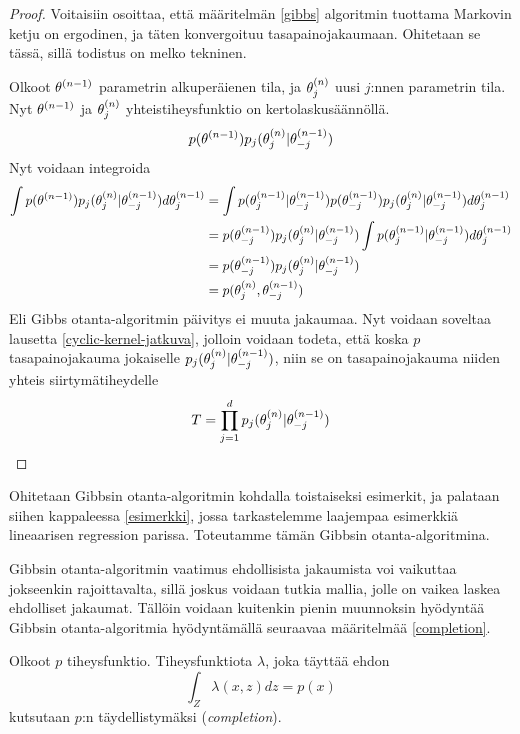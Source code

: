 \begin{proof}
	Voitaisiin osoittaa, että määritelmän \ref{gibbs} algoritmin tuottama Markovin ketju on ergodinen, ja täten konvergoituu tasapainojakaumaan. Ohitetaan se tässä, sillä todistus on melko tekninen.
	
	Olkoot $\theta^{(n-1)}$ parametrin alkuperäienen tila, ja $\theta^{(n)}_j$ uusi $j$:nnen parametrin tila. Nyt $\theta^{(n-1)}$ ja $\theta^{(n)}_j$ yhteistiheysfunktio on kertolaskusäännöllä.
	\begin{equation}
		p(\theta^{(n-1)})p_j(\theta^{(n)}_j|\theta^{(n-1)}_{-j})
	\end{equation}
	Nyt voidaan integroida
	\begin{equation}
		\begin{split}
			\int p(\theta^{(n-1)})p_j(\theta^{(n)}_j|\theta^{(n-1)}_{-j}) d\theta^{(n-1)}_j &= \int p(\theta^{(n-1)}_j|\theta^{(n-1)}_{-j})p(\theta^{(n-1)}_{-j})p_j(\theta^{(n)}_j|\theta^{(n-1)}_{-j}) d\theta^{(n-1)}_j \\
			&= p(\theta^{(n-1)}_{-j})p_j(\theta^{(n)}_j|\theta^{(n-1)}_{-j}) \int p(\theta^{(n-1)}_j|\theta^{(n-1)}_{-j}) d\theta^{(n-1)}_j \\
			&= p(\theta^{(n-1)}_{-j})p_j(\theta^{(n)}_j|\theta^{(n-1)}_{-j}) \\
			&= p(\theta^{(n)}_j,\theta^{(n-1)}_{-j})
		\end{split}
	\end{equation}
	Eli Gibbs otanta-algoritmin päivitys ei muuta jakaumaa. Nyt voidaan soveltaa lausetta \ref{cyclic-kernel-jatkuva}, jolloin voidaan todeta, että koska $p$ tasapainojakauma jokaiselle $p_j(\theta^{(n)}_j|\theta^{(n-1)}_{-j})$, niin se on tasapainojakauma niiden yhteis siirtymätiheydelle
	\begin{equation}
		T = \prod_{j=1}^{d} p_j(\theta^{(n)}_j|\theta^{(n-1)}_{-j})
	\end{equation}

\end{proof}

Ohitetaan Gibbsin otanta-algoritmin kohdalla toistaiseksi esimerkit, ja palataan siihen kappaleessa \ref{esimerkki}, jossa tarkastelemme laajempaa esimerkkiä lineaarisen regression parissa. Toteutamme tämän Gibbsin otanta-algoritmina.

Gibbsin otanta-algoritmin vaatimus ehdollisista jakaumista voi vaikuttaa jokseenkin rajoittavalta, sillä joskus voidaan tutkia mallia, jolle on vaikea laskea ehdolliset jakaumat. Tällöin voidaan kuitenkin pienin muunnoksin hyödyntää Gibbsin otanta-algoritmia hyödyntämällä seuraavaa määritelmää \ref{completion}. \cite[s.~374]{monte_carlo_book} 

\begin{maar}\label{completion}
	Olkoot $p$ tiheysfunktio. Tiheysfunktiota $\lambda$, joka täyttää ehdon
	\begin{equation}
		\int_Z \lambda(x,z) dz = p(x)
	\end{equation}
	kutsutaan $p$:n täydellistymäksi (\textit{completion}).
\end{maar}

